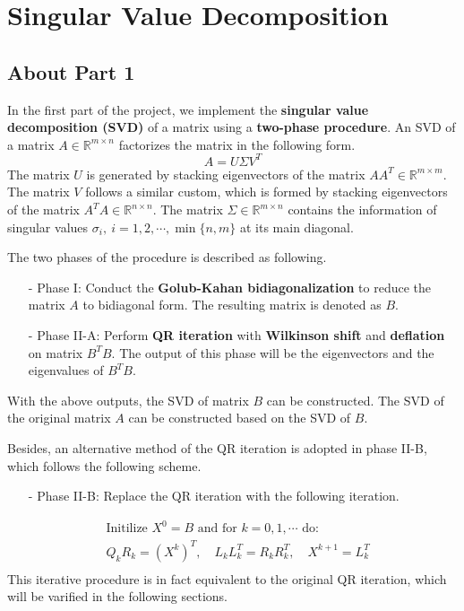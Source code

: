 \section{Singular Value Decomposition}
\subsection{About Part 1}
In the first part of the project, we implement the \textbf{singular value decomposition (SVD)} of a matrix using a \textbf{two-phase procedure}. An SVD of a matrix $A \in \mathbb{R}^{m \times n}$ factorizes the matrix in the following form.
\begin{equation}\tag{2.1}
    A = U \Sigma V^T
\end{equation}
The matrix $U$ is generated by stacking eigenvectors of the matrix $AA^T \in \mathbb{R}^{m \times m}$. The matrix $V$ follows a similar custom, which is formed by stacking eigenvectors of the matrix $A^TA \in \mathbb{R}^{n \times n}$. The matrix $\Sigma \in \mathbb{R}^{m \times n}$ contains the information of singular values $\sigma_i, \ i = 1,2,\cdots,\min\{n, m\}$ at its main diagonal.

The two phases of the procedure is described as following.
\begin{enumerate}
\item[-] Phase I: Conduct the \textbf{Golub-Kahan bidiagonalization} to reduce the matrix $A$ to bidiagonal form. The resulting matrix is denoted as $B$.
\item[-] Phase II-A: Perform \textbf{QR iteration} with \textbf{Wilkinson shift} and \textbf{deflation} on matrix $B^TB$. The output of this phase will be the eigenvectors and the eigenvalues of $B^TB$.  
\end{enumerate}
With the above outputs, the SVD of matrix $B$ can be constructed. The SVD of the original matrix $A$ can be constructed based on the SVD of $B$.

Besides, an alternative method of the QR iteration is adopted in phase II-B, which follows the following scheme.
\begin{enumerate}
\item[-] Phase II-B: Replace the QR iteration with the following iteration.
\end{enumerate}
\begin{equation}\tag{2.2}
    \begin{aligned}
    &\text{Initilize $X^0 = B$ and for $k = 0, 1, \cdots$ do:} \\
    & Q_kR_k = (X^k)^T, \quad L_kL_k^T = R_kR_k^T, \quad X^{k + 1} = L_k^T\\
    \end{aligned}
\end{equation}
This iterative procedure is in fact equivalent to the original QR iteration, which will be varified in the following sections.

